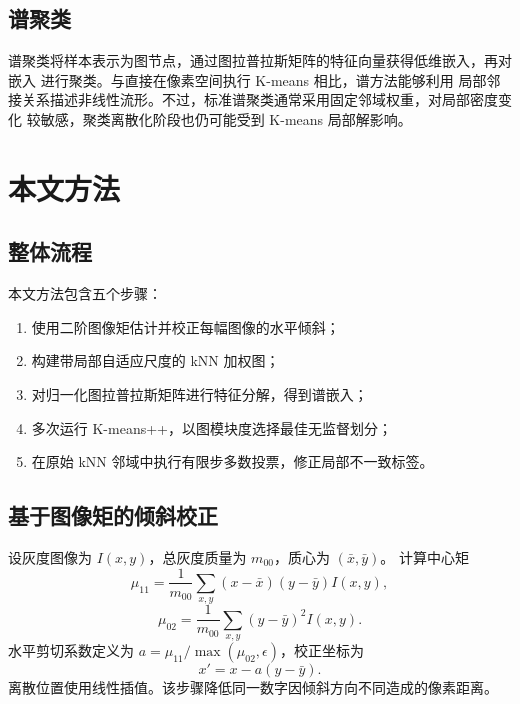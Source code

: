 \documentclass[12pt,a4paper,UTF8]{ctexart}
\begin{document}
\subsection{谱聚类}

谱聚类将样本表示为图节点，通过图拉普拉斯矩阵的特征向量获得低维嵌入，再对嵌入
进行聚类\cite{shi2000,ng2002}。与直接在像素空间执行 K-means 相比，谱方法能够利用
局部邻接关系描述非线性流形。不过，标准谱聚类通常采用固定邻域权重，对局部密度变化
较敏感，聚类离散化阶段也仍可能受到 K-means 局部解影响。

\section{本文方法}

\subsection{整体流程}

本文方法包含五个步骤：

\begin{enumerate}
    \item 使用二阶图像矩估计并校正每幅图像的水平倾斜；
    \item 构建带局部自适应尺度的 kNN 加权图；
    \item 对归一化图拉普拉斯矩阵进行特征分解，得到谱嵌入；
    \item 多次运行 K-means++，以图模块度选择最佳无监督划分；
    \item 在原始 kNN 邻域中执行有限步多数投票，修正局部不一致标签。
\end{enumerate}

\subsection{基于图像矩的倾斜校正}

设灰度图像为 $I(x,y)$，总灰度质量为 $m_{00}$，质心为 $(\bar{x},\bar{y})$。
计算中心矩
\begin{equation}
    \mu_{11}=\frac{1}{m_{00}}\sum_{x,y}
    (x-\bar{x})(y-\bar{y})I(x,y),
\end{equation}
\begin{equation}
    \mu_{02}=\frac{1}{m_{00}}\sum_{x,y}
    (y-\bar{y})^2 I(x,y).
\end{equation}
水平剪切系数定义为 $a=\mu_{11}/\max(\mu_{02},\epsilon)$，校正坐标为
\begin{equation}
    x'=x-a(y-\bar{y}).
\end{equation}
离散位置使用线性插值。该步骤降低同一数字因倾斜方向不同造成的像素距离。
\end{document}
